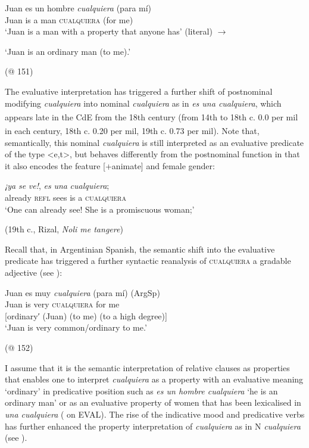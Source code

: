 \ea \label{ex:key:324} %
  \gll Juan es un hombre \textit{cualquiera} (para mí)\\
Juan is a man \textsc{cualquiera} (for me)\\
  \glt ‘Juan is a man with a property that anyone has’ (literal) $\rightarrow$

‘Juan is an ordinary man (to me).’

  (@ 151)
\z

The evaluative interpretation has triggered a further shift of postnominal modifying \textit{cualquiera} into nominal \textit{cualquiera} as in \textit{es una cualquiera}, which appears late in the CdE from the 18th century (from 14th to 18th\textsuperscript{} c. 0.0 per mil in each century, 18th\textsuperscript{} c. 0.20 per mil, 19th\textsuperscript{} c. 0.73 per mil). Note that, semantically, this nominal \textit{cualquiera} is still interpreted as an evaluative predicate of the type <e,t>, but behaves differently from the postnominal function in that it also encodes the feature [+animate] and female gender:

\ea \label{ex:key:325} %
 \gll \textit{¡ya} \textit{se} \textit{ve!}, \textit{es} \textit{una} \textit{cualquiera};\\
  already \textsc{refl} sees is a \textsc{cualquiera}\\
\glt ‘One can already see! She is a promiscuous woman;’

  (19th c., Rizal, \textit{Noli me tangere})
\z

Recall that, in Argentinian Spanish, the semantic shift into the evaluative predicate has triggered a further syntactic reanalysis of \textsc{cualquiera} a gradable adjective (see ):

\ea \label{ex:key:326} %
  \gll Juan es muy \textit{cualquiera} (para mí)  \hfill (ArgSp)\\
  Juan is very \textsc{cualquiera} for me\\
  
  {[ordinary′ (Juan) (to me) (to a high degree)]}\\
  \glt ‘Juan is very common/ordinary to me.’

    (@ 152)
\z

I assume that it is the semantic interpretation of relative clauses as properties that enables one to interpret \textit{cualquiera} as a property with an evaluative meaning ‘ordinary’ in predicative position such as \textit{es un hombre cualquiera} ‘he is an ordinary man’ or as an evaluative property of women that has been lexicalised in \textit{una cualquiera} ( on EVAL). The rise of the indicative mood and predicative verbs has further enhanced the property interpretation of \textit{cualquiera} as in N \textit{cualquiera} (see ).

